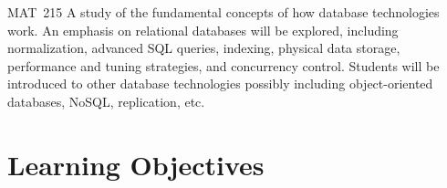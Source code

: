 \documentclass[11pt]{article}
\begin{document}




\tableofcontents

\begin{catalogentry}{MAT~215}
  A study of the fundamental concepts of how database technologies work.
  An emphasis on relational databases will be explored,
  including normalization, advanced SQL queries, indexing, physical data storage,
  performance and tuning strategies, and concurrency control.
  Students will be introduced to other database technologies
  possibly including object-oriented databases, NoSQL, replication, etc.
\end{catalogentry}

\section{Learning Objectives}
\end{document}
